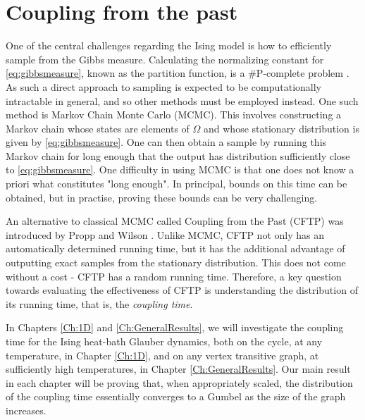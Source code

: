 

\section{Coupling from the past}
	One of the central challenges regarding the Ising model is how to efficiently sample from the Gibbs measure. Calculating the normalizing constant for \eqref{eq:gibbsmeasure}, known as the partition function, is a \#P-complete problem \cite{Jerrum1993-ii}. As such a direct approach to sampling is expected to be computationally intractable in general, and so other methods must be employed instead. One such method is Markov Chain Monte Carlo (MCMC). This involves constructing a Markov chain whose states are elements of $\Omega$ and whose stationary distribution is given by \eqref{eq:gibbsmeasure}. One can then obtain a sample by running this Markov chain for long enough that the output has distribution sufficiently close to \eqref{eq:gibbsmeasure}.
	One difficulty in using MCMC is that one does not know a priori what constitutes "long enough". In principal, bounds on this time can be obtained, but in practise, proving these bounds can be very challenging.

	An alternative to classical MCMC called Coupling from the Past (CFTP) was introduced by Propp and Wilson \cite{Propp1996-cf}. Unlike MCMC, CFTP not only has an automatically determined running time, but it has the additional advantage of outputting exact samples from the stationary distribution. This does not come without a cost - CFTP has a random running time. Therefore, a key question towards evaluating the effectiveness of CFTP is understanding the distribution of its running time, that is, the \emph{coupling time}.

	In Chapters \ref{Ch:1D} and \ref{Ch:GeneralResults}, we will investigate the coupling time for the Ising heat-bath Glauber dynamics, both on the cycle, at any temperature, in Chapter \ref{Ch:1D}, and on any vertex transitive graph, at sufficiently high temperatures, in Chapter \ref{Ch:GeneralResults}. Our main result in each chapter will be proving that, when appropriately scaled, the distribution of the coupling time essentially converges to a Gumbel as the size of the graph increases. 

